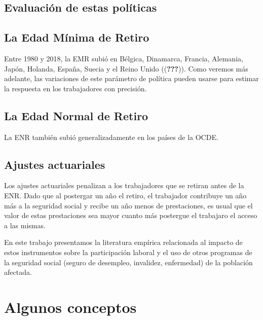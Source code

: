 \documentclass[]{article}
\begin{document}
\hypertarget{evaluaciuxf3n-de-estas-poluxedticas}{%
\subsection{Evaluación de estas
políticas}\label{evaluaciuxf3n-de-estas-poluxedticas}}

\hypertarget{la-edad-muxednima-de-retiro}{%
\subsection{La Edad Mínima de
Retiro}\label{la-edad-muxednima-de-retiro}}

Entre 1980 y 2018, la EMR subió en Bélgica, Dinamarca, Francia,
Alemania, Japón, Holanda, España, Suecia y el Reino Unido
(({\textbf{???}})). Como veremos más adelante, las variaciones de este
parámetro de política pueden usarse para estimar la respuesta en los
trabajadores con precisión.

\hypertarget{la-edad-normal-de-retiro}{%
\subsection{La Edad Normal de Retiro}\label{la-edad-normal-de-retiro}}

La ENR también subió generalizadamente en los países de la OCDE.

\hypertarget{ajustes-actuariales}{%
\subsection{Ajustes actuariales}\label{ajustes-actuariales}}

Los ajustes actuariales penalizan a los trabajadores que se retiran
antes de la ENR. Dado que al postergar un año el retiro, el trabajador
contribuye un año más a la seguridad social y recibe un año menos de
prestaciones, es usual que el valor de estas prestaciones sea mayor
cuanto más postergue el trabajaro el acceso a las mismas.

En este trabajo presentamos la literatura empírica relacionada al
impacto de estos instrumentos sobre la participación laboral y el uso de
otros programas de la seguridad social (seguro de desempleo, invalidez,
enfermedad) de la población afectada.

\hypertarget{algunos-conceptos}{%
\section{Algunos conceptos}\label{algunos-conceptos}}
\end{document}
